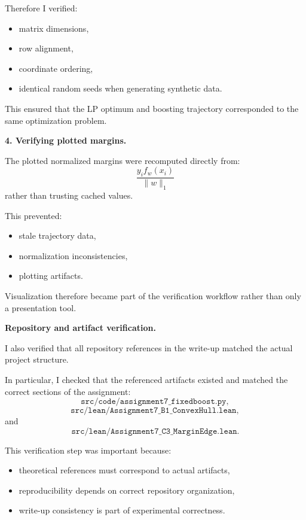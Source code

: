 \documentclass[11pt]{article}
\begin{document}
\begin{enumerate}
\begin{solutionbox}
Therefore I verified:
\begin{itemize}
    \item matrix dimensions,
    \item row alignment,
    \item coordinate ordering,
    \item identical random seeds when generating synthetic data.
\end{itemize}

This ensured that the LP optimum and boosting trajectory corresponded to the same optimization problem.

\medskip

\textbf{4. Verifying plotted margins.}

The plotted normalized margins were recomputed directly from:
\[
\frac{
y_if_w(x_i)
}{
\|w\|_1
}
\]
rather than trusting cached values.

This prevented:
\begin{itemize}
    \item stale trajectory data,
    \item normalization inconsistencies,
    \item plotting artifacts.
\end{itemize}

Visualization therefore became part of the verification workflow rather than only a presentation tool.

\bigskip

\textbf{Repository and artifact verification.}

I also verified that all repository references in the write-up matched the actual project structure.

In particular, I checked that the referenced artifacts existed and matched the correct sections of the assignment:
\[
\texttt{src/code/assignment7\_fixedboost.py},
\]
\[
\texttt{src/lean/Assignment7\_B1\_ConvexHull.lean},
\]
and
\[
\texttt{src/lean/Assignment7\_C3\_MarginEdge.lean}.
\]

This verification step was important because:
\begin{itemize}
    \item theoretical references must correspond to actual artifacts,
    \item reproducibility depends on correct repository organization,
    \item write-up consistency is part of experimental correctness.
\end{itemize}


\end{solutionbox}
\end{enumerate}
\end{document}
